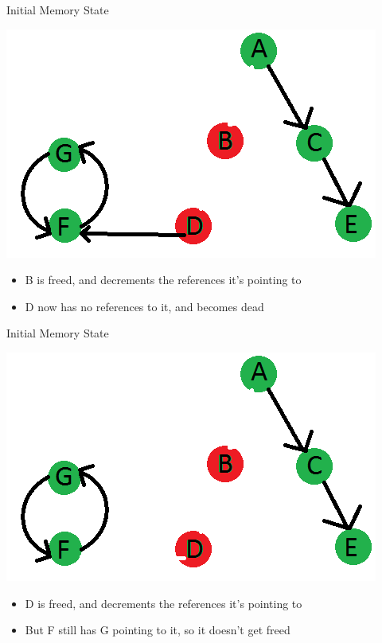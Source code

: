 \documentclass{beamer}
\begin{document}
\begin{frame}{Initial Memory State}
	\begin{center}
		\includegraphics[width=\textwidth]{graphics/memState2.png}
	\end{center}
	\begin{itemize}
		\item B is freed, and decrements the references it's pointing to
		\item D now has no references to it, and becomes dead
	\end{itemize}
\end{frame}
\begin{frame}{Initial Memory State}
	\begin{center}
		\includegraphics[width=\textwidth]{graphics/memState3.png}
	\end{center}
	\begin{itemize}
		\item D is freed, and decrements the references it's pointing to
		\item But F still has G pointing to it, so it doesn't get freed
	\end{itemize}
\end{frame}
\end{document}
